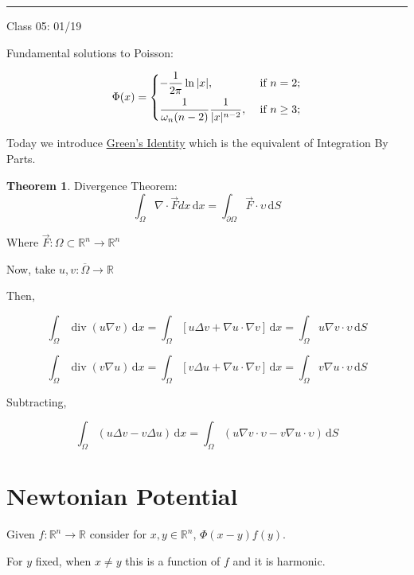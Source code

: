\documentclass{article}
\theoremstyle{definition}
\newtheorem{theorem}{Theorem}
\begin{document}
\hfil
\hrule

Class 05: 01/19

Fundamental solutions to Poisson:

\[
    \Phi(x) = \begin{dcases}
        -\frac{1}{2\pi}\ln \vert x \vert , &\text{ if }n=2  ;\\
        \frac{1}{\omega_n(n-2)}\frac{1}{\vert x \vert ^{n-2}}, &\text{ if }  n\geq 3;\\
    \end{dcases}
\]

Today we introduce \underline{Green's Identity} which is the equivalent of Integration By Parts.

\begin{theorem}
    Divergence Theorem:
    \[
        \int_{\Omega }^{} \nabla \cdot \vec{F} dx \,\mathrm{d}x = \int_{\partial \Omega }^{} \vec{F} \cdot \upsilon  \,\mathrm{d}S 
    \]

    Where \(\vec{F} : \Omega \subset \mathbb{R} ^n \to \mathbb{R} ^n\) 

\end{theorem}

Now, take \(u,v:\overline{\Omega } \to \mathbb{R} \) 

Then,

\[
    \int_{\Omega }^{} \operatorname{div}(u \nabla v) \,\mathrm{d}x = \int_{\Omega}^{} \left[u \Delta v + \nabla u \cdot \nabla v\right]  \,\mathrm{d}x = \int_{\Omega }^{} u \nabla v \cdot \upsilon \,\mathrm{d}S 
\]

\[
    \int_{\Omega }^{} \operatorname{div}(v \nabla u) \,\mathrm{d}x = \int_{\Omega}^{} \left[ v \Delta u + \nabla u \cdot \nabla v \right] \,\mathrm{d}x = \int_{\Omega }^{} v \nabla u \cdot \upsilon \,\mathrm{d}S 
\]

Subtracting,

\[
    \int_{\Omega }^{} (u \Delta v - v \Delta u) \,\mathrm{d}x = \int_{\Omega }^{} (u \nabla v \cdot \upsilon - v \nabla u \cdot \upsilon ) \,\mathrm{d}S  
\]

\section*{Newtonian Potential}

Given \(f:\mathbb{R} ^n \to \mathbb{R} \) consider for \(x,y\in \mathbb{R} ^n\), \(\Phi(x-y)f(y)\).

For \(y\) fixed, when \(x \neq y\) this is a function of \(f\) and it is harmonic.
\end{document}

